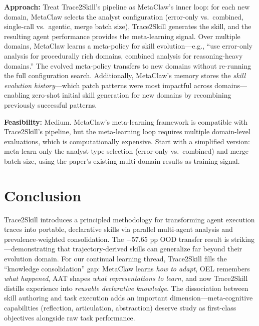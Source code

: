 \documentclass[11pt]{article}
\begin{document}
\textbf{Approach:} Treat Trace2Skill's pipeline as MetaClaw's inner loop: for each new domain, MetaClaw selects the analyst configuration (error-only vs.\ combined, single-call vs.\ agentic, merge batch size), Trace2Skill generates the skill, and the resulting agent performance provides the meta-learning signal. Over multiple domains, MetaClaw learns a meta-policy for skill evolution---e.g., ``use error-only analysis for procedurally rich domains, combined analysis for reasoning-heavy domains.'' The evolved meta-policy transfers to new domains without re-running the full configuration search. Additionally, MetaClaw's memory stores the \textit{skill evolution history}---which patch patterns were most impactful across domains---enabling zero-shot initial skill generation for new domains by recombining previously successful patterns.

\textbf{Feasibility:} Medium. MetaClaw's meta-learning framework is compatible with Trace2Skill's pipeline, but the meta-learning loop requires multiple domain-level evaluations, which is computationally expensive. Start with a simplified version: meta-learn only the analyst type selection (error-only vs.\ combined) and merge batch size, using the paper's existing multi-domain results as training signal.

\section{Conclusion}

Trace2Skill introduces a principled methodology for transforming agent execution traces into portable, declarative skills via parallel multi-agent analysis and prevalence-weighted consolidation. The +57.65 pp OOD transfer result is striking---demonstrating that trajectory-derived skills can generalize far beyond their evolution domain. For our continual learning thread, Trace2Skill fills the ``knowledge consolidation'' gap: MetaClaw learns \textit{how to adapt}, OEL remembers \textit{what happened}, AAT shapes \textit{what representations to learn}, and now Trace2Skill distills experience into \textit{reusable declarative knowledge}. The dissociation between skill authoring and task execution adds an important dimension---meta-cognitive capabilities (reflection, articulation, abstraction) deserve study as first-class objectives alongside raw task performance.
\end{document}
